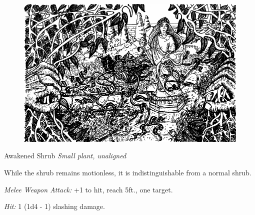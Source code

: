 \documentclass[palace_of_the_silver_princess]{subfiles}
\begin{document}
\begin{figure}[!ht]
    \includegraphics[width=\textwidth]{img/garden.png}
\end{figure}


\begin{monsterbox}{Awakened Shrub}
	\textit{Small plant, unaligned}\\
	\hline
	\basics[
		armorclass = {9},
		hitpoints = {10 (3d6)},
		speed = {20~ft.}]
	\hline
	\stats[
		STR = \stat{3},
		DEX = \stat{8},
		CON = \stat{11},
		INT = \stat{10},
		WIS = \stat{10},
		CHA = \stat{6}]
	\hline
	\details[
        damagevulnerabilities = {fire},
        damageresistances = {piercing},
		senses = {passive Perception 10},
		languages = {Common},
		challenge = {0 (10 XP)}]
	\hline
	\begin{monsteraction}
        While the shrub remains motionless, it is indistinguishable
        from a normal shrub.
	\end{monsteraction}

    \begin{monsteraction}[Rake]
		\textit{Melee Weapon Attack:} +1 to hit, reach 5ft., one target.

        \textit{Hit:} 1 (1d4 - 1) slashing damage.
	\end{monsteraction}
\end{monsterbox}
\end{document}
